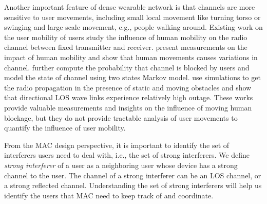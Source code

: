 \documentclass[10pt, conference, letterpaper]{IEEEtran}
\begin{document}
Another important feature of dense wearable network is that channels are more sensitive to user movements, including small local movement like turning torso or swinging and large scale movement, e.g., people walking around. Existing work on the user mobility of users \cite{humanactivity}\cite{blockagein60ghz}\cite{timevaryingpathshadowing} study the influence of human mobility on the radio channel between fixed transmitter and receiver. \cite{humanactivity}\cite{timevaryingpathshadowing} present measurements on the impact of human mobility and show that human movements causes variations in channel. \cite{timevaryingpathshadowing} further compute the probability that channel is blocked by users and model the state of channel using two states Markov model. 
\cite{blockagein60ghz} use simulations to get the radio propagation in the presence of static and moving obstacles and show that directional LOS wave links experience relatively high outage. These works provide valuable measurements and insights on the influence of moving human blockage, but they do not provide tractable analysis of user movements to quantify the influence of user mobility.





From the MAC design perspective, it is important to identify the set of interferers users need to deal with, i.e., the set of strong interferers. We define \emph{strong interferer} of a user as a neighboring user whose device has a strong channel to the user. The channel of a strong interferer can be an LOS channel, or a strong reflected channel. Understanding the set of strong interferers will help us identify the users that MAC need to keep track of and coordinate.
\end{document}

